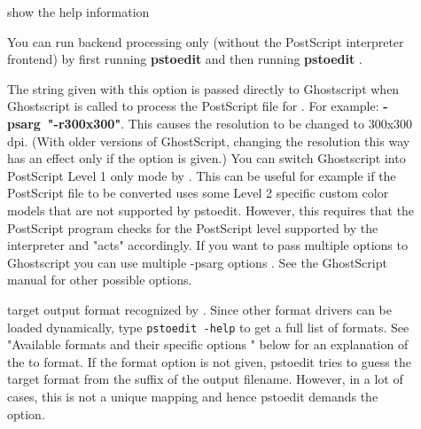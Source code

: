 \documentclass[english,a4paper]{article}
\begin{document}
\begin{description}
\item[] 
show the help information


\item[] 
You can run backend processing only (without the PostScript interpreter frontend) by first running \textbf{pstoedit}    and then running \textbf{pstoedit}     . 


\item[] 
The string given with this option is passed directly to Ghostscript when Ghostscript is called to process the PostScript file for . For example:      \textbf{-psarg}\textbf{~"}\textbf{-r300x300}\textbf{"}. This causes the resolution to be changed to 300x300 dpi. (With older versions of GhostScript, changing the resolution this way has an effect only if the  option is given.)   You can switch Ghostscript into PostScript Level 1 only mode by  . This can be useful for example if the PostScript file to be converted uses some Level 2 specific custom color models that are not supported by pstoedit. However, this requires that the PostScript program checks for the PostScript level supported by the interpreter and "acts" accordingly. If you want to pass multiple options to Ghostscript you can use multiple  -psarg options   . See the GhostScript manual for other possible options. 


\item[] 
target output format recognized by .  Since other format drivers can be loaded dynamically, type  \texttt{pstoedit -help} to get a full list of formats. See  "Available formats and their specific options " below for an explanation of the  to  format. If the format option is not given, pstoedit tries to guess the target format  from the suffix of the output filename. However, in a lot of cases, this is not a unique mapping and hence pstoedit demands the  option.


\end{description}
\end{document}
